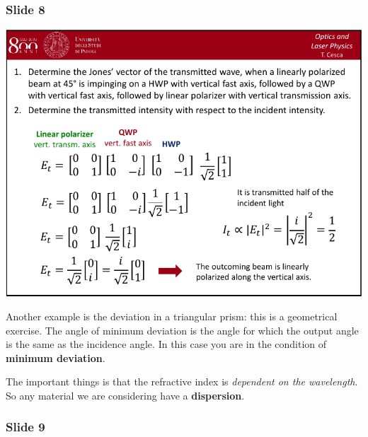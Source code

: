 \documentclass[../main/main.tex]{subfiles}
\begin{document}
\subsubsection*{Slide 8}

\begin{minipage}[]{0.5\linewidth}
\centering
\includegraphics[page=8,width=1\textwidth]{../lessons/pdf_file/04_lecture.pdf}
\end{minipage}
\hspace{0.3cm}\vspace{0.3cm}
\begin{minipage}[c]{0.47\linewidth}

Another example is the deviation in a triangular prism: this is a geometrical exercise. The angle of minimum deviation is the angle for which the output angle is the same as the incidence angle. In this case you are in the condition of \textbf{minimum deviation}.

The important things is that the refractive index is \emph{dependent on the wavelength}. So any material we are considering have a \textbf{dispersion}.

\end{minipage}

\subsubsection*{Slide 9}
\end{document}
